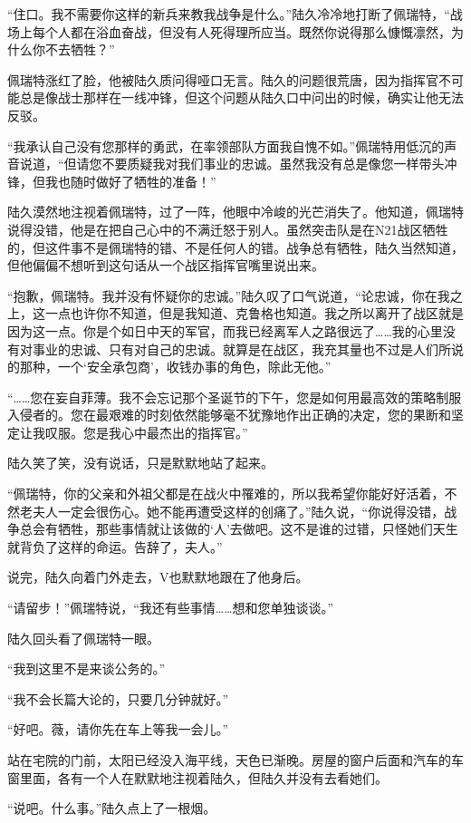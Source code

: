 “住口。我不需要你这样的新兵来教我战争是什么。”陆久冷冷地打断了佩瑞特，“战场上每个人都在浴血奋战，但没有人死得理所应当。既然你说得那么慷慨凛然，为什么你不去牺牲？”

佩瑞特涨红了脸，他被陆久质问得哑口无言。陆久的问题很荒唐，因为指挥官不可能总是像战士那样在一线冲锋，但这个问题从陆久口中问出的时候，确实让他无法反驳。

“我承认自己没有您那样的勇武，在率领部队方面我自愧不如。”佩瑞特用低沉的声音说道，“但请您不要质疑我对我们事业的忠诚。虽然我没有总是像您一样带头冲锋，但我也随时做好了牺牲的准备！”

陆久漠然地注视着佩瑞特，过了一阵，他眼中冷峻的光芒消失了。他知道，佩瑞特说得没错，他是在把自己心中的不满迁怒于别人。虽然突击队是在N21战区牺牲的，但这件事不是佩瑞特的错、不是任何人的错。战争总有牺牲，陆久当然知道，但他偏偏不想听到这句话从一个战区指挥官嘴里说出来。

“抱歉，佩瑞特。我并没有怀疑你的忠诚。”陆久叹了口气说道，“论忠诚，你在我之上，这一点也许你不知道，但是我知道、克鲁格也知道。我之所以离开了战区就是因为这一点。你是个如日中天的军官，而我已经离军人之路很远了……我的心里没有对事业的忠诚、只有对自己的忠诚。就算是在战区，我充其量也不过是人们所说的那种，一个‘安全承包商’，收钱办事的角色，除此无他。”

“……您在妄自菲薄。我不会忘记那个圣诞节的下午，您是如何用最高效的策略制服入侵者的。您在最艰难的时刻依然能够毫不犹豫地作出正确的决定，您的果断和坚定让我叹服。您是我心中最杰出的指挥官。”

陆久笑了笑，没有说话，只是默默地站了起来。

“佩瑞特，你的父亲和外祖父都是在战火中罹难的，所以我希望你能好好活着，不然老夫人一定会很伤心。她不能再遭受这样的创痛了。”陆久说，“你说得没错，战争总会有牺牲，那些事情就让该做的‘人’去做吧。这不是谁的过错，只怪她们天生就背负了这样的命运。告辞了，夫人。”

说完，陆久向着门外走去，V也默默地跟在了他身后。

“请留步！”佩瑞特说，“我还有些事情……想和您单独谈谈。”

陆久回头看了佩瑞特一眼。

“我到这里不是来谈公务的。”

“我不会长篇大论的，只要几分钟就好。”

“好吧。薇，请你先在车上等我一会儿。”

站在宅院的门前，太阳已经没入海平线，天色已渐晚。房屋的窗户后面和汽车的车窗里面，各有一个人在默默地注视着陆久，但陆久并没有去看她们。

“说吧。什么事。”陆久点上了一根烟。

